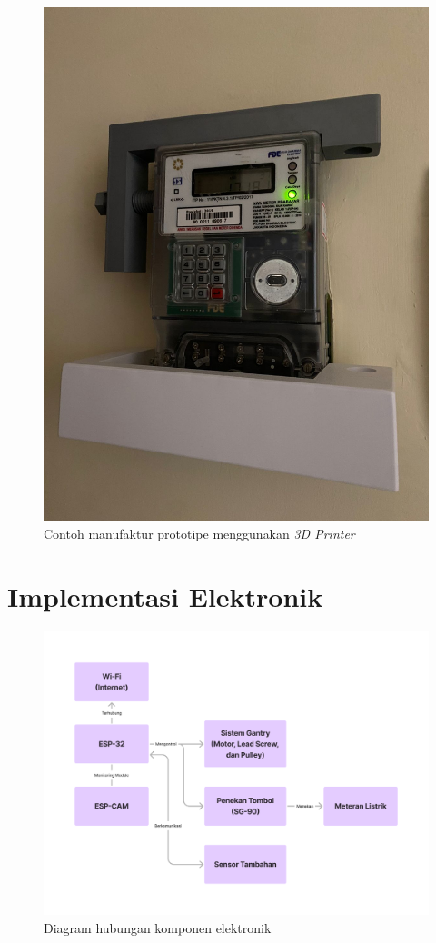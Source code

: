 \begin{figure}[H]
  \centering
  \includegraphics[width=0.4\linewidth]{gambar/contoh-prototipe-kerangka.jpg}
  \caption{Contoh manufaktur prototipe menggunakan \textit{3D Printer}}
  \label{fig:hasil-prototipe-1}
\end{figure}

\section{Implementasi Elektronik}

\begin{figure}[H]
  \centering
  \includegraphics[width=1\linewidth]{gambar/implementasi-elektronik.png}
  \caption{Diagram hubungan komponen elektronik}
  \label{fig:implementasi-elektronik}
\end{figure}

